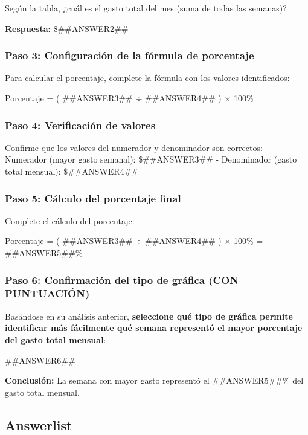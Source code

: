 \documentclass[
]{article}
\begin{document}
Según la tabla, ¿cuál es el gasto total del mes (suma de todas las
semanas)?

\textbf{Respuesta:} \$\#\#ANSWER2\#\#

\subsubsection{Paso 3: Configuración de la fórmula de
porcentaje}\label{paso-3-configuraciuxf3n-de-la-fuxf3rmula-de-porcentaje}

Para calcular el porcentaje, complete la fórmula con los valores
identificados:

Porcentaje = ( \#\#ANSWER3\#\# ÷ \#\#ANSWER4\#\# ) × 100\%

\subsubsection{Paso 4: Verificación de
valores}\label{paso-4-verificaciuxf3n-de-valores}

Confirme que los valores del numerador y denominador son correctos: -
Numerador (mayor gasto semanal): \$\#\#ANSWER3\#\# - Denominador (gasto
total mensual): \$\#\#ANSWER4\#\#

\subsubsection{Paso 5: Cálculo del porcentaje
final}\label{paso-5-cuxe1lculo-del-porcentaje-final}

Complete el cálculo del porcentaje:

Porcentaje = ( \#\#ANSWER3\#\# ÷ \#\#ANSWER4\#\# ) × 100\% =
\#\#ANSWER5\#\#\%

\subsubsection{Paso 6: Confirmación del tipo de gráfica (CON
PUNTUACIÓN)}\label{paso-6-confirmaciuxf3n-del-tipo-de-gruxe1fica-con-puntuaciuxf3n}

Basándose en su análisis anterior, \textbf{seleccione qué tipo de
gráfica permite identificar más fácilmente qué semana representó el
mayor porcentaje del gasto total mensual}:

\#\#ANSWER6\#\#

\textbf{Conclusión:} La semana con mayor gasto representó el
\#\#ANSWER5\#\#\% del gasto total mensual.

\subsection{Answerlist}\label{answerlist}
\end{document}
